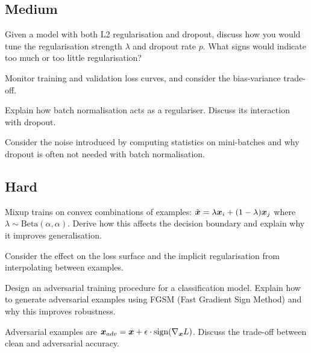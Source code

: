 \subsection*{Medium}

\begin{exercisebox}[medium]
\begin{problem}
Given a model with both L2 regularisation and dropout, discuss how you would tune the regularisation strength $\lambda$ and dropout rate $p$. What signs would indicate too much or too little regularisation?
\end{problem}
\begin{hintbox}
Monitor training and validation loss curves, and consider the bias-variance trade-off.
\end{hintbox}
\end{exercisebox}


\begin{exercisebox}[medium]
\begin{problem}
Explain how batch normalisation acts as a regulariser. Discuss its interaction with dropout.
\end{problem}
\begin{hintbox}
Consider the noise introduced by computing statistics on mini-batches and why dropout is often not needed with batch normalisation.
\end{hintbox}
\end{exercisebox}


\subsection*{Hard}

\begin{exercisebox}[hard]
\begin{problem}
Mixup trains on convex combinations of examples: $\tilde{\boldsymbol{x}} = \lambda \boldsymbol{x}_i + (1-\lambda)\boldsymbol{x}_j$ where $\lambda \sim \text{Beta}(\alpha, \alpha)$. Derive how this affects the decision boundary and explain why it improves generalisation.
\end{problem}
\begin{hintbox}
Consider the effect on the loss surface and the implicit regularisation from interpolating between examples.
\end{hintbox}
\end{exercisebox}


\begin{exercisebox}[hard]
\begin{problem}
Design an adversarial training procedure for a classification model. Explain how to generate adversarial examples using FGSM (Fast Gradient Sign Method) and why this improves robustness.
\end{problem}
\begin{hintbox}
Adversarial examples are $\boldsymbol{x}_{adv} = \boldsymbol{x} + \epsilon \cdot \text{sign}(\nabla_{\boldsymbol{x}} L)$. Discuss the trade-off between clean and adversarial accuracy.
\end{hintbox}
\end{exercisebox}


